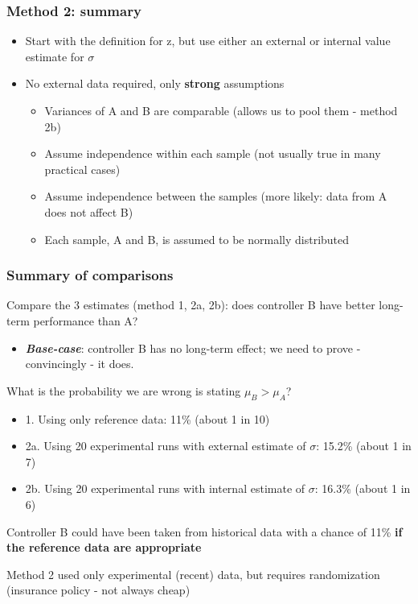 \begin{frame}\frametitle{Method 2: summary}
	\begin{itemize}
		\item	Start with the definition for z, but use either an external or internal value estimate for $\sigma$
		\item	No external data required, only \textbf{strong} assumptions
		\begin{itemize}
			\item	Variances of A and B are comparable (allows us to pool them - method 2b)
			\item	Assume independence within each sample (not usually true in many practical cases)
			\item	Assume independence between the samples (more likely: data from A does not affect B)
			\item	Each sample, A and B, is assumed to be normally distributed
		\end{itemize}
	\end{itemize}
\end{frame}

\begin{frame}\frametitle{Summary of comparisons}

	Compare the 3 estimates (method 1, 2a, 2b): does controller B have better long-term performance than A?
	\begin{itemize}
		\item	\textbf{\emph{Base-case}}: controller B has no long-term effect; we need to prove - convincingly - it does.
	\end{itemize}

	What is the probability we are wrong is stating $\mu_B > \mu_A$?
	\begin{itemize}
		\item	1. Using only reference data: 11\% (about 1 in 10)
		\item	2a. Using 20 experimental runs with external estimate of $\sigma$: 15.2\% (about 1 in 7)
		\item	2b. Using 20 experimental runs with internal estimate of $\sigma$: 16.3\% (about 1 in 6)
	\end{itemize}

	Controller B could have been taken from historical data with a chance of 11\% \textbf{if the reference data are appropriate}

	Method 2 used only experimental (recent) data, but requires randomization (insurance policy - not always cheap)
\end{frame}

